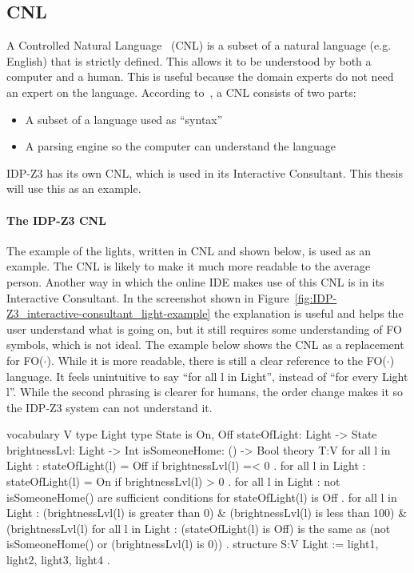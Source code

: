\documentclass[11pt,a4paper]{report}
\newcommand{\fodot}{FO($\cdot$)\xspace}
\begin{document}
\subsection{CNL}
\label{CNL}
A Controlled Natural Language~\cite{CNL} (CNL) is a subset of a natural language (e.g. English) that is strictly defined. This allows it to be understood by both a computer and a human. This is useful because the domain experts do not need an expert on the language. According to~\cite{CNLAttemptoControlledEnglish}, a CNL consists of two parts:
 \begin{itemize}
 	\item A subset of a language used as ``syntax'' 
     \item A parsing engine so the computer can understand the language
 \end{itemize}
 IDP-Z3 has its own CNL, which is used in its Interactive Consultant. This thesis will use this as an example.

\paragraph{The IDP-Z3 CNL}
The example of the lights, written in CNL and shown below, is used as an example. The CNL is likely to make it much more readable to the average person. Another way in which the online IDE makes use of this CNL is in its Interactive Consultant. In the screenshot shown in Figure~\ref{fig:IDP-Z3_interactive-consultant_light-example} the explanation is useful and helps the user understand what is going on, but it still requires some understanding of FO symbols, which is not ideal.
The example below shows the CNL as a replacement for \fodot. While it is more readable, there is still a clear reference to the \fodot language. It feels unintuitive to say ``for all l in Light'', instead of ``for every Light l''. While the second phrasing is clearer for humans, the order change makes it so the IDP-Z3 system can not understand it.

\begin{idplisting}
vocabulary V {
    type Light
    type State is {On, Off}
    stateOfLight: Light -> State
    brightnessLvl: Light -> Int
    isSomeoneHome: () -> Bool
}
theory T:V {
    {
        for all l in Light : stateOfLight(l) = Off if brightnessLvl(l) =< 0 .
        for all l in Light : stateOfLight(l) = On if brightnessLvl(l) > 0 .
    }
    for all l in Light : not isSomeoneHome() are sufficient conditions for stateOfLight(l) is Off .
    for all l in Light : (brightnessLvl(l) is greater than 0) & (brightnessLvl(l) is less than 100) & (brightnessLvl(l) %
    for all l in Light : (stateOfLight(l) is Off) is the same as (not isSomeoneHome() or (brightnessLvl(l) is 0)) .
}
structure S:V {
    Light := {light1, light2, light3, light4} .
}
\end{idplisting}
\end{document}
